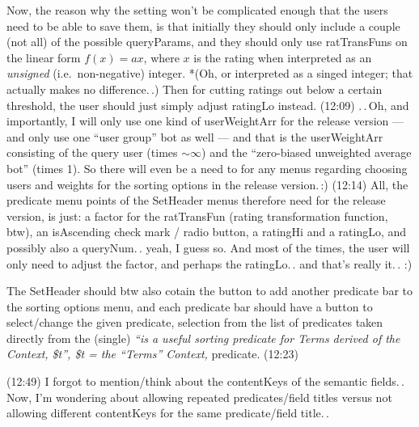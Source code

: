 \documentclass{report}
\begin{document}
Now, the reason why the setting won't be complicated enough that the users need to be able to save them, is that initially they should only include a couple (not all) of the possible queryParams, and they should only use ratTransFuns on the linear form $f(x) = a x$, where $x$ is the rating when interpreted as an \emph{unsigned} (i.e.\ non-negative) integer. *(Oh, or interpreted as a singed integer; that actually makes no difference.\,.) Then for cutting ratings out below a certain threshold, the user should just simply adjust ratingLo instead. (12:09) .\,.\,Oh, and importantly, I will only use one kind of userWeightArr for the release version --- and only use one ``user group'' bot as well --- and that is the userWeightArr consisting of the query user (times $\sim$$\infty$) and the ``zero-biased unweighted average bot'' (times 1). So there will even be a need to for any menus regarding choosing users and weights for the sorting options in the release version.\,:) (12:14) All, the predicate menu points of the SetHeader menus therefore need for the release version, is just: a factor for the ratTransFun (rating transformation function, btw), an isAscending check mark / radio button, a ratingHi and a ratingLo, and possibly also a queryNum.\,. yeah, I guess so. And most of the times, the user will only need to adjust the factor, and perhaps the ratingLo.\,. and that's really it.\,. :)

The SetHeader should btw also cotain the button to add another predicate bar to the sorting options menu, and each predicate bar should have a button to select/change the given predicate, selection from the list of predicates taken directly from the (single) \textit{``is a useful sorting predicate for Terms derived of the Context, \$t'', \$t = the ``Terms'' Context,} predicate. (12:23)

(12:49) I forgot to mention/think about the contentKeys of the semantic fields.\,. Now, I'm wondering about allowing repeated predicates/field titles versus not allowing different contentKeys for the same predicate/field title.\,. 
\end{document}
